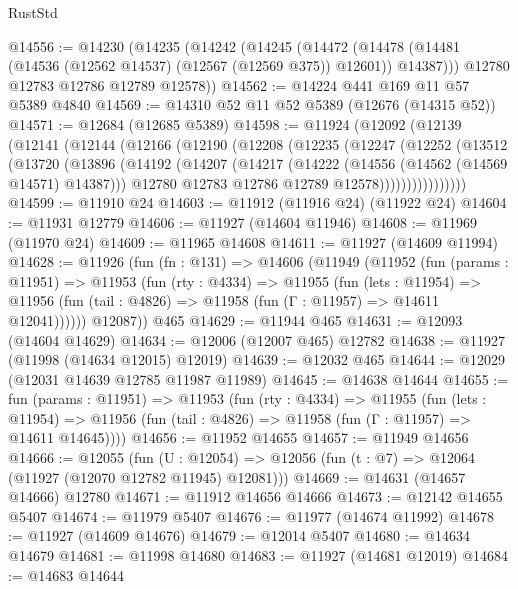 \begin{lexlean}{RustStd}
\begin{coremodule}
@14556 := @14230
    (@14235
      (@14242
        (@14245
          (@14472 (@14478 (@14481 (@14536 (@12562 @14537) (@12567 (@12569 @375)) @12601)) @14387)))
        @12780
        @12783
        @12786
        @12789
        @12578))
@14562 := @14224 @441 @169 @11 @57 @5389 @4840
@14569 := @14310 @52 @11 @52 @5389 (@12676 (@14315 @52))
@14571 := @12684 (@12685 @5389)
@14598 := @11924
    (@12092
      (@12139
        (@12141
          (@12144
            (@12166
              (@12190
                (@12208
                  (@12235
                    (@12247
                      (@12252
                        (@13512
                          (@13720
                            (@13896
                              (@14192
                                (@14207
                                  (@14217
                                    (@14222 (@14556 (@14562 (@14569 @14571) @14387)))
                                    @12780
                                    @12783
                                    @12786
                                    @12789
                                    @12578))))))))))))))))
@14599 := @11910 @24
@14603 := @11912 (@11916 @24) (@11922 @24)
@14604 := @11931 @12779
@14606 := @11927 (@14604 @11946)
@14608 := @11969 (@11970 @24)
@14609 := @11965 @14608
@14611 := @11927 (@14609 @11994)
@14628 := @11926
    (fun (fn : @131) =>
    @14606
      (@11949
        (@11952
          (fun (params : @11951) =>
          @11953
            (fun (rty : @4334) =>
            @11955
              (fun (lets : @11954) =>
              @11956 (fun (tail : @4826) => @11958 (fun (Γ : @11957) => @14611 @12041))))))
        @12087))
    @465
@14629 := @11944 @465
@14631 := @12093 (@14604 @14629)
@14634 := @12006 (@12007 @465) @12782
@14638 := @11927 (@11998 (@14634 @12015) @12019)
@14639 := @12032 @465
@14644 := @12029 (@12031 @14639 @12785 @11987 @11989)
@14645 := @14638 @14644
@14655 := fun (params : @11951) =>
  @11953
    (fun (rty : @4334) =>
    @11955
      (fun (lets : @11954) =>
      @11956 (fun (tail : @4826) => @11958 (fun (Γ : @11957) => @14611 @14645))))
@14656 := @11952 @14655
@14657 := @11949 @14656
@14666 := @12055
    (fun (U : @12054) => @12056 (fun (t : @7) => @12064 (@11927 (@12070 @12782 @11945) @12081)))
@14669 := @14631 (@14657 @14666) @12780
@14671 := @11912 @14656 @14666
@14673 := @12142 @14655 @5407
@14674 := @11979 @5407
@14676 := @11977 (@14674 @11992)
@14678 := @11927 (@14609 @14676)
@14679 := @12014 @5407
@14680 := @14634 @14679
@14681 := @11998 @14680
@14683 := @11927 (@14681 @12019)
@14684 := @14683 @14644

\end{coremodule}
\end{lexlean}
